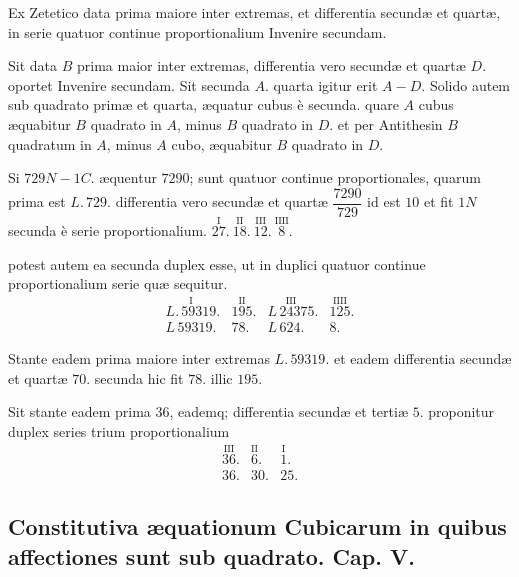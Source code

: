\documentclass[11pt,a4paper]{article}
\begin{document}

Ex Zetetico data prima maiore inter extremas, et differentia secundæ et quartæ, in serie quatuor continue proportionalium Invenire secundam.

Sit data $B$ prima maior inter extremas, differentia vero secundæ et quartæ $D$. oportet Invenire secundam. Sit secunda $A$. quarta igitur erit $A - D$. Solido autem sub quadrato primæ et quarta, æquatur cubus è secunda. quare $A$ cubus æquabitur $B$ quadrato in $A$, minus $B$ quadrato in $D$. et per Antithesin $B$ quadratum in $A$, minus $A$ cubo, æquabitur $B$ quadrato in $D$.

Si $729N - 1C.$ æquentur $7290$; sunt quatuor continue proportionales, quarum prima est $L.\,729$. differentia vero secundæ et quartæ $\dfrac{7290}{729}$ id est $10$ et fit $1N$ secunda è serie proportionalium. $\overset{\mathrm{I}}{27}.\ \overset{\mathrm{II}}{18}.\ \overset{\mathrm{III}}{12}.\ \overset{\mathrm{IIII}}{8}.$

potest autem ea secunda duplex esse, ut in duplici quatuor continue proportionalium serie quæ sequitur.
\[ \begin{array}{llll} \overset{\mathrm{I}}{L.\,59319}. & \overset{\mathrm{II}}{195}. & \overset{\mathrm{III}}{L\,24375}. & \overset{\mathrm{IIII}}{125}. \\[4pt] L\,59319. & 78. & L\,624. & 8. \end{array} \]

Stante eadem prima maiore inter extremas $L.\,59319$. et eadem differentia secundæ et quartæ $70$. secunda hic fit $78$. illic $195$.

Sit stante eadem prima $36$, eademq; differentia secundæ et tertiæ $5$. proponitur duplex series trium proportionalium
\[ \begin{array}{lll} \overset{\mathrm{III}}{36}. & \overset{\mathrm{II}}{6}. & \overset{\mathrm{I}}{1}. \\[4pt] 36. & 30. & 25. \end{array} \]

\subsection*{Constitutiva æquationum Cubicarum in quibus affectiones sunt sub quadrato. Cap. V.}
\end{document}
